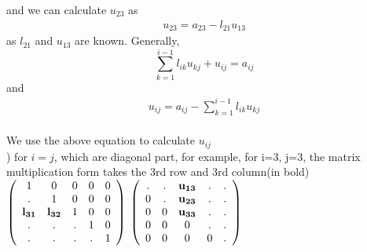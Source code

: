 \documentclass[a4paper]{article}
\begin{document}
and we can calculate $u_{23}$ as
\begin{align*}
	u_{23} = a_{23} - l_{21}u_{13}
\end{align*}
as $l_{21}$ and $u_{13}$ are known.
Generally,\\
\begin{equation}
	\sum_{k=1}^{i-1} l_{ik} u_{kj} + u_{ij} = a_{ij}
\end{equation}
and
\begin{align*}
	u_{ij} = a_{ij} - \sum_{k=1}^{i-1} l_{ik} u_{kj} 
\end{align*}
\\
We use the above equation to calculate $u_{ij}$\\
) for $i=j$, which are diagonal part, for example, for i=3, j=3, the matrix multiplication form takes the 3rd row and 3rd column(in bold)\\
$\left( \begin{array}{ccccc}
1      & 	0 	& 	0 	 & 	 0 		& 	0 	\\
. & 	1 	& 	0 	 &	 0 		& 	0	\\
{\bf l_{31}} & {\bf l_{32}} &   1  	 &   0		&	0	\\
. & . & . &   1 		& 	0	\\
. & . & . & . 	& 	1	\\\end{array} \right)$
$\left( \begin{array}{ccccc}
	. 	&  	.	 &  {\bf u_{13}}  & 	. & . 	\\
	0	&  	. 	 & 	{\bf u_{23}}  &	. & .	\\
	0	& 	0	 &   {\bf u_{33}} & . &	.	\\
	0 	& 	0	 & 	 0		 &  . & 	.	\\
	0	& 	0	 & 	 0 		 &  0    & .	\\\end{array} \right)\\
$\\
\end{document}

